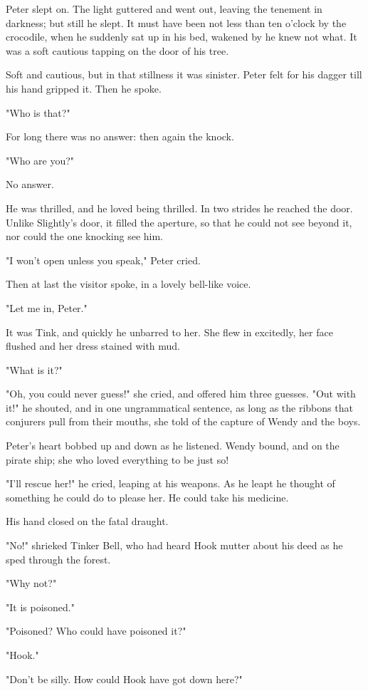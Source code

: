 Peter slept on. The light guttered and went out, leaving
the tenement in darkness; but still he slept. It must have been not less
than ten o'clock by the crocodile, when he suddenly sat up in his bed,
wakened by he knew not what. It was a soft cautious tapping on the door of
his tree.


Soft and cautious, but in that stillness it was sinister. Peter felt for
his dagger till his hand gripped it. Then he spoke.


"Who is that?"


For long there was no answer: then again the knock.


"Who are you?"


No answer.


He was thrilled, and he loved being thrilled. In two strides he reached
the door. Unlike Slightly's door, it filled the aperture, so
that he could not see beyond it, nor could the one knocking see him.


"I won't open unless you speak," Peter cried.


Then at last the visitor spoke, in a lovely bell-like voice.


"Let me in, Peter."


It was Tink, and quickly he unbarred to her. She flew in excitedly, her
face flushed and her dress stained with mud.


"What is it?"


"Oh, you could never guess!" she cried, and offered him three guesses.
"Out with it!" he shouted, and in one ungrammatical sentence, as long as
the ribbons that conjurers pull from their mouths, she told of
the capture of Wendy and the boys.


Peter's heart bobbed up and down as he listened. Wendy bound, and on the
pirate ship; she who loved everything to be just so!


"I'll rescue her!" he cried, leaping at his weapons. As he leapt he
thought of something he could do to please her. He could take his
medicine.


His hand closed on the fatal draught.


"No!" shrieked Tinker Bell, who had heard Hook mutter about his deed as he
sped through the forest.


"Why not?"


"It is poisoned."


"Poisoned? Who could have poisoned it?"


"Hook."


"Don't be silly. How could Hook have got down here?"


